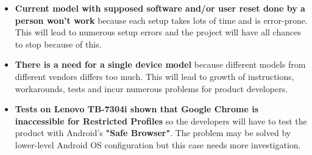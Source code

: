\begin{itemize}
\item \textbf{Current model with supposed software and/or user reset
done by a person won't work} because each setup takes lots of time and
is error-prone. This will lead to numerous setup errors and the project
will have all chances to stop because of this.
\item \textbf{There is a need for a single device model} because different
models from different vendors differs too much. This will lead to
growth of instructions, workarounds, tests and incur numerous problems
for product developers.
\item \textbf{Tests on Lenovo TB-7304i shown that Google Chrome is
inaccessible for Restricted Profiles} so the developers will have to
test the product with Android's \textbf{"Safe Browser"}. The problem
may be solved by lower-level Android OS configuration but this case
needs more investigation.
\end{itemize}

